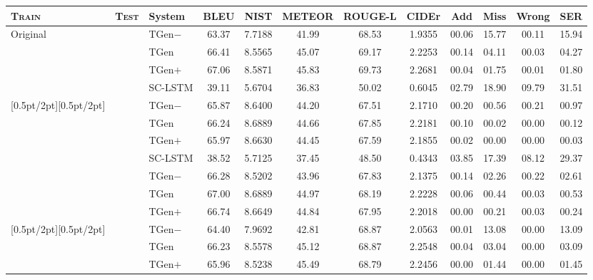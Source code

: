 \documentclass[11pt,a4paper]{article}
\newcommand\Tstrut{\rule{0pt}{2.3ex}}       \newcommand\Bstrut{\rule[-1.5ex]{0pt}{0pt}}
\begin{document}
\begin{table*}[tb]
\footnotesize\centering
\begin{tabular}{lcl|ccccc|cccc}\hline
\bf \textsc{Train}          & \bf \textsc{Test}              
        & \bf System              & \bf BLEU & \bf NIST & \bf \hspace{-2mm}METEOR\hspace{-2mm} & \bf \hspace{-1mm}ROUGE-L\hspace{-3mm} & \bf CIDEr & \bf Add & \bf Miss & \bf Wrong &\bf SER\Tstrut \\\hline
\multirow{4}{*}{Original} & \parbox[t]{2mm}{} 
        & TGen$-$  & 63.37 & 7.7188 & 41.99 & 68.53 & 1.9355 & 00.06 & 15.77 & 00.11 & 15.94\Tstrut  \\ &   & TGen     & 66.41 & 8.5565 & 45.07 & 69.17 & 2.2253 & 00.14 & 04.11 & 00.03 & 04.27  \\ &   & TGen$+$  & 67.06 & 8.5871 & 45.83 & 69.73 & 2.2681 & 00.04 & 01.75 & 00.01 & 01.80  \\ &   & SC-LSTM  & 39.11 & 5.6704 & 36.83 & 50.02 & 0.6045 & 02.79 & 18.90 & 09.79 & 31.51 \\[0.5pt/2pt][0.5pt/2pt]
  & & TGen$-$  & 65.87 & 8.6400 & 44.20 & 67.51 & 2.1710 & 00.20 & 00.56 & 00.21 & 00.97\Tstrut  \\ &   & TGen     & 66.24 & 8.6889 & 44.66 & 67.85 & 2.2181 & 00.10 & 00.02 & 00.00  & 00.12  \\ &   & TGen$+$  & 65.97 & 8.6630 & 44.45 & 67.59 & 2.1855 & 00.02 & 00.00 & 00.00 & 00.03  \\ &   & SC-LSTM  & 38.52 & 5.7125 & 37.45 & 48.50 & 0.4343 & 03.85 & 17.39 & 08.12 & 29.37 \\
 & & TGen$-$  & 66.28 & 8.5202 & 43.96 & 67.83 & 2.1375 & 00.14 & 02.26 & 00.22 & 02.61\Tstrut  \\ &   & TGen     & 67.00 & 8.6889 & 44.97 & 68.19 & 2.2228 & 00.06 & 00.44 & 00.03 & 00.53  \\ &   & TGen$+$  & 66.74 & 8.6649 & 44.84 & 67.95 & 2.2018 & 00.00 & 00.21 & 00.03 & 00.24 \\[0.5pt/2pt][0.5pt/2pt]   & & TGen$-$  & 64.40 & 7.9692 & 42.81 & 68.87 & 2.0563 & 00.01 & 13.08 & 00.00 & 13.09\Tstrut  \\ &   & TGen     & 66.23 & 8.5578 & 45.12 & 68.87 & 2.2548 & 00.04 & 03.04 & 00.00 & 03.09  \\ &   & TGen$+$  & 65.96 & 8.5238 & 45.49 & 68.79 & 2.2456 & 00.00 & 01.44 & 00.00 & 01.45  \\\hline \end{tabular}

\end{table*}
\end{document}
